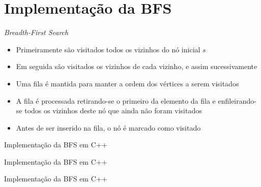 \section{Implementação da BFS}

\begin{frame}[fragile]{{\it Breadth-First Search}}

    \begin{itemize}
        \item Primeiramente são visitados todos os vizinhos do nó inicial $s$

        \item Em seguida são visitados os vizinhos de cada vizinho, e assim sucessivamente

        \item Uma fila é mantida para manter a ordem dos vértices a serem visitados

        \item A fila é processada retirando-se o primeiro da elemento da fila e enfileirando-se
            todos os vizinhos deste nó que ainda não foram visitados

        \item Antes de ser inserido na fila, o nó é marcado como visitado
    \end{itemize}

\end{frame}

\begin{frame}[fragile]{Implementação da BFS em C++}
\end{frame}

\begin{frame}[fragile]{Implementação da BFS em C++}
\end{frame}

\begin{frame}[fragile]{Implementação da BFS em C++}
\end{frame}
